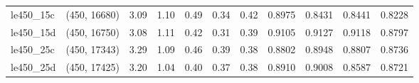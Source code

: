 \begin{tabular}{llrrrrrrrrr}
 le450\_15c & (450, 16680) &  3.09 & 1.10 & 0.49 &  0.34 &   0.42 &   0.8975 &   0.8431 &     0.8441 &      0.8228 \\
 le450\_15d & (450, 16750) &  3.08 & 1.11 & 0.42 &  0.31 &   0.39 &   0.9105 &   0.9127 &     0.9118 &      0.8797 \\
 le450\_25c & (450, 17343) &  3.29 & 1.09 & 0.46 &  0.39 &   0.38 &   0.8802 &   0.8948 &     0.8807 &      0.8736 \\
 le450\_25d & (450, 17425) &  3.20 & 1.04 & 0.40 &  0.37 &   0.38 &   0.8910 &   0.9008 &     0.8587 &      0.8721 \\
\bottomrule
\end{tabular}

